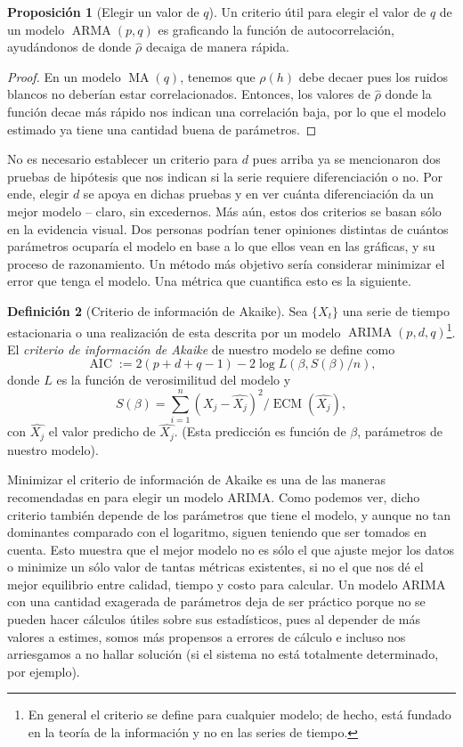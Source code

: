 \documentclass[11pt,letterpaper]{article}
\newcommand{\MSE}{\ensuremath{\operatorname{ECM}}}
\newcommand{\MA}{\ensuremath{\operatorname{MA}}}
\newcommand{\ARMA}{\ensuremath{\operatorname{ARMA}}}
\newcommand{\ARIMA}{\ensuremath{\operatorname{ARIMA}}}
\theoremstyle{definition}
\newtheorem{definition}{Definición}[section]
\theoremstyle{theorem}
\newtheorem{proposition}[definition]{Proposición}
\theoremstyle{remark}
\begin{document}
	\begin{proposition}[Elegir un valor de \(q\)]
		Un criterio útil para elegir el valor de \(q\) de un modelo \(\ARMA(p,q)\) es graficando la {\rm función de autocorrelación}, ayudándonos de donde \(\hat{\rho}\) decaiga de manera rápida.
	\end{proposition}
	\begin{proof}
		En un modelo \(\MA(q)\), tenemos que \(\rho(h)\) debe decaer pues los ruidos blancos no deberían estar correlacionados. Entonces, los valores de \(\hat{\rho}\) donde la función decae más rápido nos indican una correlación baja, por lo que el modelo estimado ya tiene una cantidad buena de parámetros.
	\end{proof}
	No es necesario establecer un criterio para \(d\) pues arriba ya se mencionaron dos pruebas de hipótesis que nos indican si la serie requiere diferenciación o no. Por ende, elegir \(d\) se apoya en dichas pruebas y en ver cuánta diferenciación da un mejor modelo -- claro, sin excedernos. Más aún, estos dos criterios se basan sólo en la evidencia visual. Dos personas podrían tener opiniones distintas de cuántos parámetros ocuparía el modelo en base a lo que ellos vean en las gráficas, y su proceso de razonamiento. Un método más objetivo sería considerar minimizar el error que tenga el modelo. Una métrica que cuantifica esto es la siguiente.
	\begin{definition}[Criterio de información de Akaike] \label{defAkaike}
		Sea \(\{X_t\}\) una serie de tiempo estacionaria o una realización de esta descrita por un modelo \(\ARIMA(p,d,q)\)\footnote{En general el criterio se define para cualquier modelo; de hecho, está fundado en la teoría de la información y no en las series de tiempo.}. El \textit{criterio de información de Akaike} de nuestro modelo se define como \[\operatorname{AIC}:=2(p+d+q-1)-2\log L(\beta,S(\beta)/n),\] donde \(L\) es la función de verosimilitud del modelo y \[S(\beta)=\sum_{i=1}^n(X_j-\hat{X_j})^2/\MSE(\hat{X_j}),\] con \(\hat{X_j}\) el valor predicho de \(\hat{X_j}\). (Esta predicción es función de \(\beta\), parámetros de nuestro modelo).
	\end{definition}
	Minimizar el criterio de información de Akaike es una de las maneras recomendadas en \autocite{brockwelldavis} para elegir un modelo ARIMA. Como podemos ver, dicho criterio también depende de los parámetros que tiene el modelo, y aunque no tan dominantes comparado con el logaritmo, siguen teniendo que ser tomados en cuenta. Esto muestra que el mejor modelo no es sólo el que ajuste mejor los datos o minimize un sólo valor de tantas métricas existentes, si no el que nos dé el mejor equilibrio entre calidad, tiempo y costo para calcular. Un modelo ARIMA con una cantidad exagerada de parámetros deja de ser práctico porque no se pueden hacer cálculos útiles sobre sus estadísticos, pues al depender de más valores a estimes, somos más propensos a errores de cálculo e incluso nos arriesgamos a no hallar solución (si el sistema no está totalmente determinado, por ejemplo).\par
\end{document}
